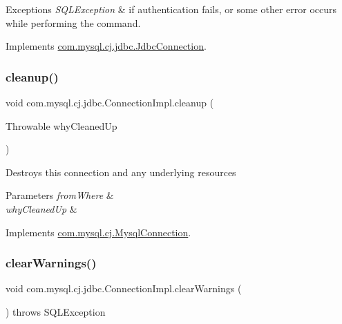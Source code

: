 \begin{DoxyExceptions}{Exceptions}
{\em S\+Q\+L\+Exception} & if authentication fails, or some other error occurs while performing the command. \\
\hline
\end{DoxyExceptions}


Implements \mbox{\hyperlink{interfacecom_1_1mysql_1_1cj_1_1jdbc_1_1_jdbc_connection_aed0496e0f2c1236f2784f92b45a482ef}{com.\+mysql.\+cj.\+jdbc.\+Jdbc\+Connection}}.

\mbox{\label{classcom_1_1mysql_1_1cj_1_1jdbc_1_1_connection_impl_ac72cb58dc4f2b002b1882b69815cc64b}} 
\subsubsection{\texorpdfstring{cleanup()}{cleanup()}}
{\footnotesize\ttfamily void com.\+mysql.\+cj.\+jdbc.\+Connection\+Impl.\+cleanup (\begin{DoxyParamCaption}\item[{Throwable}]{why\+Cleaned\+Up }\end{DoxyParamCaption})}

Destroys this connection and any underlying resources


\begin{DoxyParams}{Parameters}
{\em from\+Where} & \\
\hline
{\em why\+Cleaned\+Up} & \\
\hline
\end{DoxyParams}


Implements \mbox{\hyperlink{interfacecom_1_1mysql_1_1cj_1_1_mysql_connection}{com.\+mysql.\+cj.\+Mysql\+Connection}}.

\mbox{\label{classcom_1_1mysql_1_1cj_1_1jdbc_1_1_connection_impl_a5f8f37e6f8b36663bae849559cc89afa}} 
\subsubsection{\texorpdfstring{clear\+Warnings()}{clearWarnings()}}
{\footnotesize\ttfamily void com.\+mysql.\+cj.\+jdbc.\+Connection\+Impl.\+clear\+Warnings (\begin{DoxyParamCaption}{ }\end{DoxyParamCaption}) throws S\+Q\+L\+Exception}

